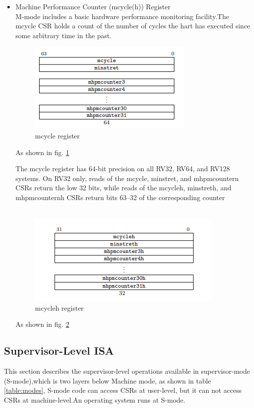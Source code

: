 \documentclass[../main.tex]{subfiles}
\begin{document}
\begin{itemize}
            
            
            
          
 \item Machine Performance Counter (mcycle(h)) Register \\
 M-mode includes a basic hardware performance monitoring facility.The mcycle CSR holds a count of the number of cycles the hart has executed since some arbitrary time in the past. 
 \begin{figure}[h]
            \centering
            \includegraphics[width=10 cm]{diagrams/mcycle.PNG}
            \caption{mcycle register}
            \label{fig:mcycle}
            \end{figure}As shown in fig. \ref{fig:mcycle}
            
 The mcycle register has 64-bit precision on all RV32, RV64, and RV128 systems.
On RV32 only, reads of the mcycle, minstret, and mhpmcountern CSRs return the low 32 bits, while reads of the mcycleh, minstreth, and mhpmcounternh CSRs return bits 63–32 of the corresponding
counter\\
\\
\begin{figure}[h]
    \centering
  \includegraphics[width=10 cm]{diagrams/mcycleh.PNG}
 \caption{mcycleh register}
 \label{fig:mcycleh}
     \end{figure}As shown in fig. \ref{fig:mcycleh}
\end{itemize}
\subsection{Supervisor-Level ISA}
This section describes the supervisor-level operations available in supervisor-mode (S-mode),which is two layers below Machine mode, as shown in table \ref{table:modes}, S-mode code can access CSRs at user-level, but it can not access CSRs at machine-level.An operating system runs at S-mode.
\end{document}
